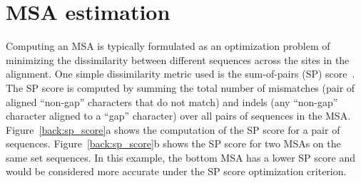 


\section{MSA estimation}\label{back:alignment}
Computing an MSA is typically formulated as an optimization problem of minimizing the dissimilarity between different sequences across the sites in the alignment.  One simple dissimilarity metric used is the sum-of-pairs (SP) score~\cite{todo}.  The SP score is computed by summing the total number of mismatches (pair of aligned ``non-gap'' characters that do not match) and indels (any ``non-gap'' character aligned to a ``gap'' character) over all pairs of sequences in the MSA.  Figure~\ref{back:sp_score}a shows the computation of the SP score for a pair of sequences.  Figure~\ref{back:sp_score}b shows the SP score for two MSAs on the same set sequences.  In this example, the bottom MSA has a lower SP score and would be considered more accurate under the SP score optimization criterion.  

